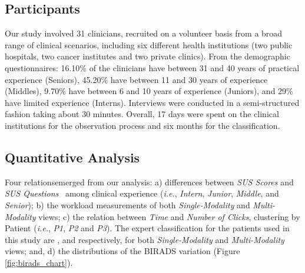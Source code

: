 \subsection{Participants}

Our study involved 31 clinicians, recruited on a volunteer basis from a broad range of clinical scenarios, including six different health institutions (two public hospitals, two cancer institutes and two private clinics).
From the demographic questionnaires: 16.10\% of the clinicians have between 31 and 40 years of practical experience (Seniors), 45.20\% have between 11 and 30 years of experience (Middles), 9.70\% have between 6 and 10 years of experience (Juniors), and 29\% have limited experience (Interns).
Interviews were conducted in a semi-structured fashion taking about 30 minutes.
Overall, 17 days were spent on the clinical institutions for the observation process and six months for the classification.

\subsection{Quantitative Analysis}

Four relations\footnotemark[2] emerged from our analysis:
a) differences between \textit{SUS Scores} and \textit{SUS Questions}~\cite{Tyllinen:2016:WNN:2858036.2858570} among clinical experience ({\em i.e.}, \textit{Intern}, \textit{Junior}, \textit{Middle}, and \textit{Senior});
b) the workload measurements of both \textit{Single-Modality} and \textit{Multi-Modality} views;
c) the relation between \textit{Time} and \textit{Number of Clicks}, clustering by Patient ({\em i.e.}, \textit{P1}, \textit{P2} and \textit{P3}).
The expert classification for the patients used in this study are ,  and  respectively, for both \textit{Single-Modality} and \textit{Multi-Modality} views; and, d) the distributions of the BIRADS variation (Figure \ref{fig:birads_chart}).


